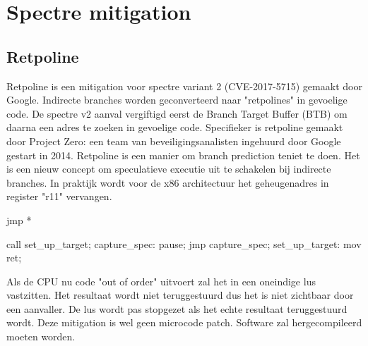 \section{Spectre mitigation}
\subsection{Retpoline}
Retpoline is een mitigation voor spectre variant 2 (CVE-2017-5715) gemaakt door Google.
Indirecte branches worden geconverteerd naar "retpolines" in gevoelige code.
De spectre v2 aanval vergiftigd eerst de Branch Target Buffer (BTB) om daarna een adres te zoeken in gevoelige code.
Specifieker is retpoline gemaakt door Project Zero: een team van beveiligingsanalisten ingehuurd door Google gestart in 2014.\parencite{Evans2014}
Retpoline is een manier om branch prediction teniet te doen.
Het is een nieuw concept om speculatieve executie uit te schakelen bij indirecte branches.
In praktijk wordt voor de x86 architectuur het geheugenadres in register "r11" vervangen.

jmp *%

 call set_up_target;
capture_spec:         
pause;
jmp capture_spec;
set_up_target:
mov %
ret;                  
\parencite{Turner2018}

Als de CPU nu code "out of order" uitvoert zal het in een oneindige lus vastzitten. Het resultaat wordt niet teruggestuurd dus het is niet zichtbaar door een aanvaller.
De lus wordt pas stopgezet als het echte resultaat teruggestuurd wordt.
Deze mitigation is wel geen microcode patch. Software zal hergecompileerd moeten worden.

